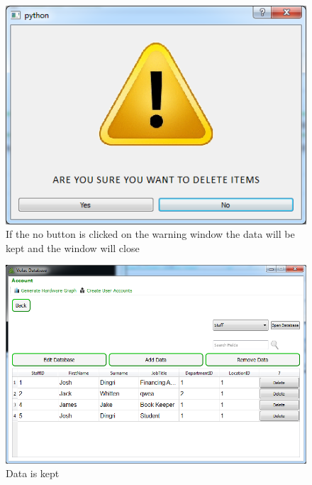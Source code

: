 \begin{figure}[H]
    \includegraphics[width=\textwidth]{./Testing/Images/NoButton.png}
    \caption{If the no button is clicked on the warning window the data will be kept and the window will close} \label{fig:NoButton}
\end{figure}

\begin{figure}[H]
    \includegraphics[width=\textwidth]{./Testing/Images/RemoveDataButtons.png}
    \caption{Data is kept}
\end{figure}

